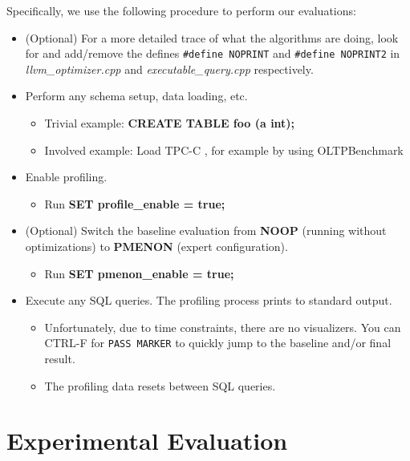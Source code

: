 \documentclass{vldb}
\newcommand{\dbCode}[1]{{\sffamily\small \textbf{#1}}\xspace}
\begin{document}
Specifically, we use the following procedure to perform our evaluations:

\begin{itemize}
    \item (Optional) For a more detailed trace of what the algorithms are doing, look for and add/remove the defines \lstinline{#define NOPRINT} and \lstinline{#define NOPRINT2} in \textit{llvm\_optimizer.cpp} and \textit{executable\_query.cpp} respectively.
    \item Perform any schema setup, data loading, etc.
    \begin{itemize}
        \item Trivial example: \dbCode{CREATE TABLE foo (a int);}
        \item Involved example: Load TPC-C \cite{tpcc}, for example by using OLTPBenchmark \cite{oltpbench}
    \end{itemize}
    \item Enable profiling.
    \begin{itemize}
        \item Run \dbCode{SET profile\_enable = true;}
    \end{itemize}
    \item (Optional) Switch the baseline evaluation from \dbCode{NOOP} (running without optimizations) to \dbCode{PMENON} (expert configuration).
    \begin{itemize}
        \item Run \dbCode{SET pmenon\_enable = true;}
    \end{itemize}
    \item Execute any SQL queries. The profiling process prints to standard output.
    \begin{itemize}
        \item Unfortunately, due to time constraints, there are no visualizers. You can CTRL-F for \lstinline{PASS MARKER} to quickly jump to the baseline and/or final result.
        \item The profiling data resets between SQL queries.
    \end{itemize}
\end{itemize}


\section{Experimental Evaluation}
\end{document}
